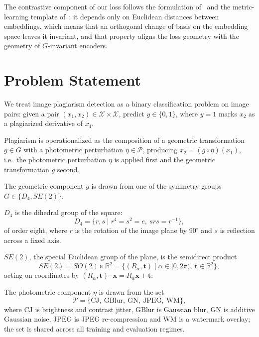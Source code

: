 \documentclass{article}
\begin{document}
The contrastive component of our loss follows the formulation of~\citet{hadsell2006dimensionality} and the metric-learning template of~\citet{chopra2005learning}: it depends only on Euclidean distances between embeddings, which means that an orthogonal change of basis on the embedding space leaves it invariant, and that property aligns the loss geometry with the geometry of $G$-invariant encoders.

\section{Problem Statement}\label{sec:problem}

We treat image plagiarism detection as a binary classification problem on image pairs: given a pair $(x_1, x_2)\in\mathcal{X}\times\mathcal{X}$, predict $y \in \{0,1\}$, where $y=1$ marks $x_2$ as a plagiarized derivative of $x_1$. 

Plagiarism is operationalized as the composition of a geometric transformation $g \in G$ with a photometric perturbation $\eta\in\mathcal{P}$, producing $x_2 = (g \circ \eta)(x_1)$, i.e.\ the photometric perturbation $\eta$ is applied first and the geometric transformation $g$ second.

The geometric component $g$ is drawn from one of the symmetry groups $G \in \{D_4, SE(2)\}$.

$D_4$ is the dihedral group of the square:
\begin{equation}\label{eq:d4-def}
  D_4 = \{ r, s \mid r^4 = s^2 = e,\ srs = r^{-1}\},
\end{equation}
of order eight, where $r$ is the rotation of the image plane by $90^\circ$ and $s$ is reflection across a fixed axis.

$SE(2)$, the special Euclidean group of the plane, is the semidirect product
\begin{equation}\label{eq:se2-def}
  SE(2) = SO(2) \ltimes \mathbb{R}^2 = \{(R_\alpha, \mathbf{t})\mid \alpha\in[0, 2\pi),\ \mathbf{t}\in\mathbb{R}^2\},
\end{equation}
acting on coordinates by $(R_\alpha, \mathbf{t})\cdot\mathbf{x} = R_\alpha\mathbf{x} + \mathbf{t}$. 

The photometric component $\eta$ is drawn from the set
\begin{equation}\label{eq:photo-set}
  \mathcal{P} = \{\mathrm{CJ},\ \mathrm{GBlur},\ \mathrm{GN},\ \mathrm{JPEG},\ \mathrm{WM}\},
\end{equation}
 where $\mathrm{CJ}$ is brightness and contrast jitter, $\mathrm{GBlur}$ is Gaussian blur, $\mathrm{GN}$ is additive Gaussian noise, $\mathrm{JPEG}$ is JPEG re-compression and $\mathrm{WM}$ is a watermark overlay; the set is shared across all training and evaluation regimes.
\end{document}
